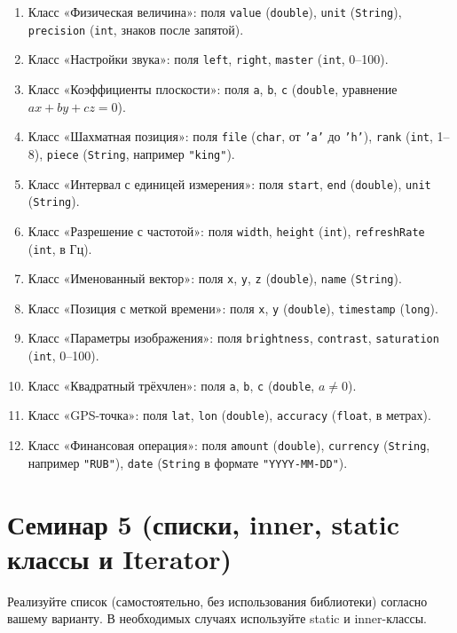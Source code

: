\documentclass[12pt]{article}
\begin{document}
\begin{enumerate}
    \item Класс «Физическая величина»: поля \texttt{value} (\texttt{double}), \texttt{unit} (\texttt{String}), \texttt{precision} (\texttt{int}, знаков после запятой).
    \item Класс «Настройки звука»: поля \texttt{left}, \texttt{right}, \texttt{master} (\texttt{int}, 0–100).
    \item Класс «Коэффициенты плоскости»: поля \texttt{a}, \texttt{b}, \texttt{c} (\texttt{double}, уравнение $ax + by + cz = 0$).
    \item Класс «Шахматная позиция»: поля \texttt{file} (\texttt{char}, от \texttt{'a'} до \texttt{'h'}), \texttt{rank} (\texttt{int}, 1–8), \texttt{piece} (\texttt{String}, например \texttt{"king"}).
    \item Класс «Интервал с единицей измерения»: поля \texttt{start}, \texttt{end} (\texttt{double}), \texttt{unit} (\texttt{String}).
    \item Класс «Разрешение с частотой»: поля \texttt{width}, \texttt{height} (\texttt{int}), \texttt{refreshRate} (\texttt{int}, в Гц).
    \item Класс «Именованный вектор»: поля \texttt{x}, \texttt{y}, \texttt{z} (\texttt{double}), \texttt{name} (\texttt{String}).
    \item Класс «Позиция с меткой времени»: поля \texttt{x}, \texttt{y} (\texttt{double}), \texttt{timestamp} (\texttt{long}).
    \item Класс «Параметры изображения»: поля \texttt{brightness}, \texttt{contrast}, \texttt{saturation} (\texttt{int}, 0–100).
    \item Класс «Квадратный трёхчлен»: поля \texttt{a}, \texttt{b}, \texttt{c} (\texttt{double}, $a \neq 0$).
    \item Класс «GPS-точка»: поля \texttt{lat}, \texttt{lon} (\texttt{double}), \texttt{accuracy} (\texttt{float}, в метрах).
    \item Класс «Финансовая операция»: поля \texttt{amount} (\texttt{double}), \texttt{currency} (\texttt{String}, например \texttt{"RUB"}), \texttt{date} (\texttt{String} в формате \texttt{"YYYY-MM-DD"}).
\end{enumerate}

\section{Семинар 5 (списки, inner, static классы и Iterator)}

Реализуйте список (самостоятельно, без использования библиотеки) согласно
вашему варианту. В необходимых случаях используйте static и inner-классы. 
\end{document}
